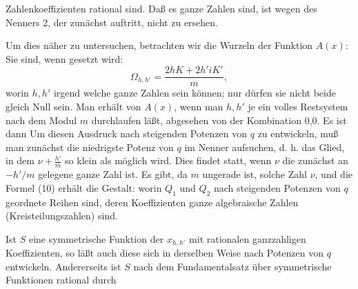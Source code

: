 Zahlenkoeffizienten rational sind. Daß es ganze Zahlen sind, ist
wegen des Nenners 2, der zunächst auftritt, nicht zu ersehen.

Um dies näher zu untersuchen, betrachten wir die Wurzeln
der Funktion $A(x)$: Sie sind, wenn gesetzt wird:
\[
\Omega_{h,h'} = \frac{2hK+2h'iK'}{m},
\]
worin $h,h'$ irgend welche ganze Zahlen sein können; nur dürfen
sie nicht beide gleich Null sein. Man erhält  von
$A(x)$, wenn man $h,h'$ je ein volles Restsystem nach dem Modul
$m$ durchlaufen läßt, abgesehen von der Kombination 0,0. Es ist
dann
Um diesen Ausdruck nach steigenden Potenzen von $q$ zu entwickeln,
muß man zunächst die niedrigste Potenz von $q$ im Nenner
aufsuchen, d. h. das Glied, in dem $\nu+\frac{h'}{m}$ so klein als möglich
wird. Dies findet statt, wenn $\nu$ die zunächst an $-h'/m$ gelegene
ganze Zahl ist. Es gibt, da $m$ ungerade ist,  solche
Zahl $\nu$, und die Formel (10) erhält die Gestalt:
worin $Q_1$ und $Q_2$ nach steigenden Potenzen von $q$ geordnete Reihen
sind, deren Koeffizienten ganze algebraische Zahlen (Kreisteilungszahlen)
sind.


Ist $S$ eine symmetrische Funktion der $x_{h,h'}$ mit rationalen
ganzzahligen Koeffizienten, so läßt auch diese sich in derselben
Weise nach Potenzen von $q$ entwickeln. Andererseits ist $S$ nach
dem Fundamentalsatz über symmetrische Funktionen rational durch
